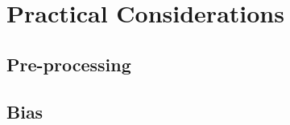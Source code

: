 \chapter{Practical Considerations}\label{chap:practical-considerations}
\section{Pre-processing}
\section{Bias}
